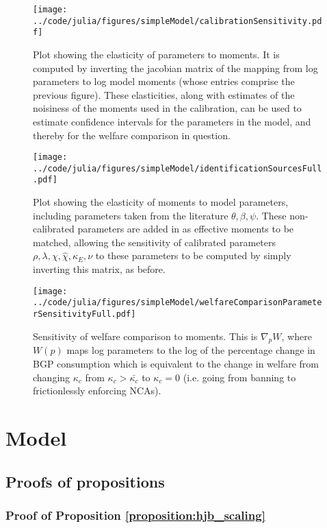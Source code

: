 \documentclass[11pt,english]{article}
\begin{document}
\begin{figure}[]
	\texttt{[image: ../code/julia/figures/simpleModel/calibrationSensitivity.pdf]}
	\caption{Plot showing the elasticity of parameters to moments. It is computed by inverting the jacobian matrix of the mapping from log parameters to log model moments (whose entries comprise the previous figure). These elasticities, along with estimates of the noisiness of the moments used in the calibration, can be used to estimate confidence intervals for the parameters in the model, and thereby for the welfare comparison in question.}
	\label{calibration_sensitivity}
\end{figure}

\begin{figure}[]
	\texttt{[image: ../code/julia/figures/simpleModel/identificationSourcesFull.pdf]}
	\caption{Plot showing the elasticity of moments to model parameters, including parameters taken from the literature $\theta , \beta, \psi$. These non-calibrated parameters are added in as effective moments to be matched, allowing the sensitivity of calibrated parameters $\rho, \lambda, \chi, \hat{\chi}, \kappa_E, \nu$ to these parameters to be computed by simply inverting this matrix, as before.}
	\label{calibration_identificationSources_full}
\end{figure}

\begin{figure}[]
	\texttt{[image: ../code/julia/figures/simpleModel/welfareComparisonParameterSensitivityFull.pdf]}
	\caption{Sensitivity of welfare comparison to moments. This is $\nabla_p W$, where $W(p)$ maps log parameters to the log of the percentage change in BGP consumption which is equivalent to the change in welfare from changing $\kappa_c$ from $\kappa_c > \bar{\kappa_c}$ to $\kappa_c = 0$ (i.e. going from banning to frictionlessly enforcing NCAs).}
	\label{welfareComparisonParameterSensitivityFull}
\end{figure}


\section{Model}\label{appendix:model}

\subsection{Proofs of propositions}

\subsubsection{Proof of Proposition \ref{proposition:hjb_scaling}}\label{appendix:proofs:proposition:hjb_scaling}
\end{document}
